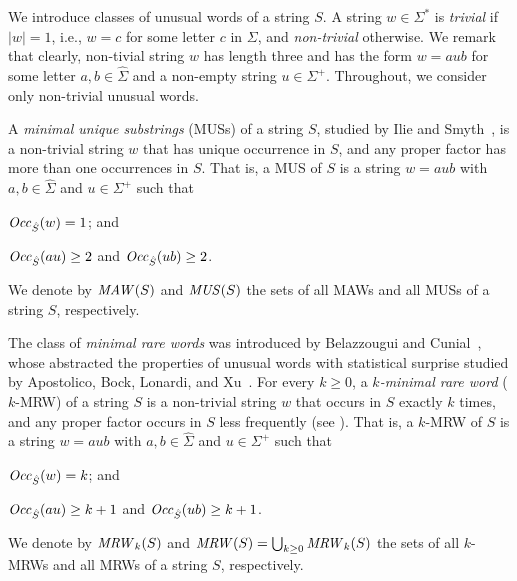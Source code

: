 We introduce classes of unusual words of a string $S$. A string $w \in \Sigma^*$ is \textit{trivial} if $|w| = 1$, i.e., $w = c$ for some letter $c$ in $\Sigma$, and \textit{non-trivial} otherwise. We remark that clearly, non-tivial string $w$ has length three and has the form $w = aub$ for some letter $a, b \in \hat\Sigma$ and a non-empty string $u \in \Sigma^+$. Throughout, we consider only non-trivial unusual words.

A \textit{minimal unique substrings} (MUSs) of a string $S$, studied by Ilie and Smyth~\cite{ilie2011minimum}, is a non-trivial string $w$ that has unique occurrence in $S$, and any proper factor has more than one occurrences in $S$. 
That is, a MUS of $S$ is a string $w = a u b$ with $a, b\in \hat\Sigma$ and $u \in \Sigma^+$ such that
\begin{enumerate*}[(i)]
\item $\mathit{Occ}_{{\hat S}}(w) = 1$; and 
\item $\mathit{Occ}_{{\hat S}}(au) \ge 2$ and $\mathit{Occ}_{{\hat S}}(ub) \ge 2$. 
\end{enumerate*}
We denote by $\MAW(S)$ and $\MUS(S)$ the sets of all MAWs and all MUSs of a string $S$, respectively. 

The class of \textit{minimal rare words} was introduced by Belazzougui and Cunial~\cite{belazzougui2015space:unusual}, whose abstracted the properties of unusual words with statistical surprise studied by Apostolico, Bock, Lonardi, and Xu~\cite{apostolico2000efficient}. 
For every $k\ge 0$, a \textit{$k$-minimal rare word} ($k$-MRW) of a string $S$ is a non-trivial string $w$ that occurs in $S$ exactly $k$ times, and any proper factor occurs in $S$ less frequently (see \cite{belazzougui2015space:unusual}). That is, a $k$-MRW of $S$ is a string $w = a u b$ with $a, b\in \hat\Sigma$ and $u \in \Sigma^+$ such that
\begin{enumerate*}[(i)]
\item $\mathit{Occ}_{{\hat S}}(w) = k$; and 
\item $\mathit{Occ}_{{\hat S}}(au) \ge k+1$ and $\mathit{Occ}_{{\hat S}}(ub) \ge k+1$. 
\end{enumerate*}
We denote by $\MRW_k(S)$ and $\MRW(S) = \bigcup_{k\ge 0} \MRW_k(S)$ the sets of all $k$-MRWs and all MRWs of a string $S$, respectively. 




